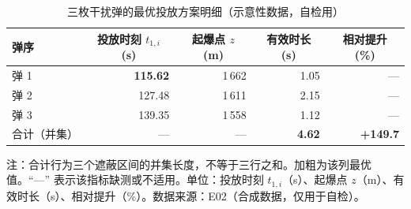 \begin{table}[htbp]
  \centering
  \caption{三枚干扰弹的最优投放方案明细（示意性数据，自检用）}
  \label{tab:selfcheck}
  \small
  \begin{tabular}{@{}l r r r r@{}}
    \toprule
    弹序 & \multicolumn{1}{c}{投放时刻 $t_{1,i}$ (s)} & \multicolumn{1}{c}{起爆点 $z$ (m)} & \multicolumn{1}{c}{有效时长 (s)} & \multicolumn{1}{c}{相对提升 (\%)} \\
    \midrule
    弹 1 & \textbf{115.62} & 1\,662 & 1.05 & — \\
    弹 2 & 127.48 & 1\,611 & 2.15 & — \\
    弹 3 & 139.35 & 1\,558 & 1.12 & — \\
    合计（并集） & — & — & \textbf{4.62} & \textbf{+149.7} \\
    \bottomrule
  \end{tabular}

  \vspace{2pt}
  {\footnotesize 注：合计行为三个遮蔽区间的并集长度，不等于三行之和。加粗为该列最优值。``—'' 表示该指标缺测或不适用。单位：投放时刻 $t_{1,i}$（s）、起爆点 $z$（m）、有效时长（s）、相对提升（\%）。数据来源：E02（合成数据，仅用于自检）。}
\end{table}
